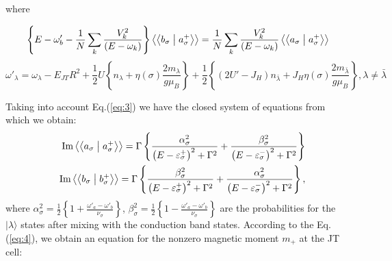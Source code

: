 \documentclass[%
 reprint,
groupedaddress,
 amsmath,amssymb,
 aps,
prb,
]{revtex4-1}
\begin{document}
where
\begin{widetext}
\begin{equation}
\left\{ {E - \omega '_b  - \frac{1}{N}\sum\limits_k {\frac{{V_k^2 }}{{\left( {E - \omega _k } \right)}}} } \right\}\left\langle {\left\langle {{b_\sigma  }}
\mathrel{\left | {\vphantom {{b_\sigma  } {a_\sigma ^ +  }}}
\right. \kern-\nulldelimiterspace}
{{a_\sigma ^ +  }} \right\rangle } \right\rangle  = \frac{1}{N}\sum\limits_k {\frac{{V_k^2 }}{{\left( {E - \omega _k } \right)}}} \left\langle {\left\langle {{a_\sigma  }}
\mathrel{\left | {\vphantom {{a_\sigma  } {a_\sigma ^ +  }}}
\right. \kern-\nulldelimiterspace}
{{a_\sigma ^ +  }} \right\rangle } \right\rangle
\label{eq:3}
\end{equation}
\begin{equation}
\omega '_\lambda   = \omega _\lambda   - E_{JT} R^2  + \frac{1}{2}U\left\{ {n_\lambda   + \eta \left( \sigma  \right)\frac{{2m_\lambda  }}{{g\mu _B }}} \right\} + \frac{1}{2}\left\{ {\left( {2U' - J_H } \right)n_{\bar \lambda }  + J_H \eta \left( \sigma  \right)\frac{{2m_{\bar \lambda } }}{{g\mu _B }}} \right\}, \lambda  \ne \bar \lambda
\nonumber
\end{equation}
\end{widetext}
Taking into account Eq.(\ref{eq:3}) we have the closed system of equations from which we obtain:
\begin{eqnarray}
&&{\mathop{\rm Im}\nolimits} \left\langle {\left\langle {{a_\sigma  }}
\mathrel{\left | {\vphantom {{a_\sigma  } {a_\sigma ^ +  }}}
\right. \kern-\nulldelimiterspace}
{{a_\sigma ^ +  }} \right\rangle } \right\rangle  = \Gamma \left\{ {\frac{{\alpha _\sigma ^2 }}{{\left( {E - \varepsilon _\sigma ^ +  } \right)^2  + \Gamma ^2 }} + \frac{{\beta _\sigma ^2 }}{{\left( {E - \varepsilon _\sigma ^ -  } \right)^2  + \Gamma ^2 }}} \right\} \nonumber \\
&&{\mathop{\rm Im}\nolimits} \left\langle {\left\langle {{b_\sigma  }}
\mathrel{\left | {\vphantom {{b_\sigma  } {b_\sigma ^ +  }}}
\right. \kern-\nulldelimiterspace}
{{b_\sigma ^ +  }} \right\rangle } \right\rangle  = \Gamma \left\{ {\frac{{\beta _\sigma ^2 }}{{\left( {E - \varepsilon _\sigma ^ +  } \right)^2  + \Gamma ^2 }} + \frac{{\alpha _\sigma ^2 }}{{\left( {E - \varepsilon _\sigma ^ -  } \right)^2  + \Gamma ^2 }}} \right\}, \nonumber \\
\label{eq:4}
\end{eqnarray}
where $\alpha _\sigma ^2  = \frac{1}{2}\left\{ {1 + \frac{{\omega '_a  - \omega '_b }}{{\nu _\sigma  }}} \right\}$, $\beta _\sigma ^2  = \frac{1}{2}\left\{ {1 - \frac{{\omega '_a  - \omega '_b }}{{\nu _\sigma  }}} \right\}$ are the probabilities for the $|\lambda\rangle$ states  after mixing with the conduction band states. According to the Eq.(\ref{eq:4}), we obtain an equation for the nonzero magnetic moment $m_{+}$ at the JT cell:
\end{document}
